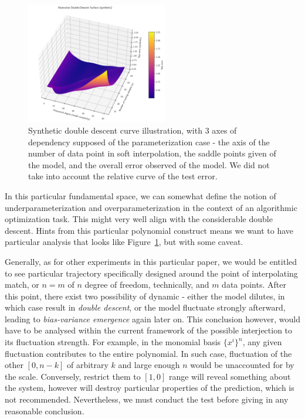 \documentclass[10pt]{article} %
\begin{document}
\begin{figure}[htb]
    \centering
    \includegraphics[width=0.55\textwidth]{media/double_descent_synthetic.png}
    \caption{Synthetic double descent curve illustration, with 3 axes of dependency supposed of the parameterization case - the axis of the number of data point in soft interpolation, the saddle points given of the model, and the overall error observed of the model. We did not take into account the relative curve of the test error.}
    \label{fig:descent_synthetic_curve}
\end{figure}

In this particular fundamental space, we can somewhat define the notion of underparameterization and overparameterization in the context of an algorithmic optimization task. This might very well align with the considerable double descent. Hints from this particular polynomial construct means we want to have particular analysis that looks like Figure~\ref{fig:descent_synthetic_curve}, but with some caveat. 

Generally, as for other experiments in this particular paper, we would be entitled to see particular trajectory specifically designed around the point of interpolating match, or $n=m$ of $n$ degree of freedom, technically, and $m$ data points. After this point, there exist two possibility of dynamic - either the model dilutes, in which case result in \textit{double descent}, or the model fluctuate strongly afterward, leading to \textit{bias-variance emergence} again later on. This conclusion however, would have to be analysed within the current framework of the possible interjection to its fluctuation strength. For example, in the monomial basis $\{x^{i}\}^{n}$, any given fluctuation contributes to the entire polynomial. In such case, fluctuation of the other $[0,n-k]$ of arbitrary $k$ and large enough $n$ would be unaccounted for by the scale. Conversely, restrict them to $[1,0]$ range will reveal something about the system, however will destroy particular properties of the prediction, which is not recommended. Nevertheless, we must conduct the test before giving in any reasonable conclusion.
\end{document}
